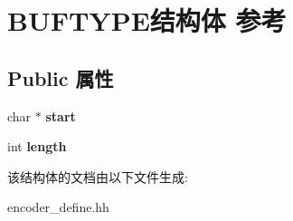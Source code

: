 \hypertarget{struct_b_u_f_t_y_p_e}{}\section{B\+U\+F\+T\+Y\+P\+E结构体 参考}
\label{struct_b_u_f_t_y_p_e}
\subsection*{Public 属性}
\begin{DoxyCompactItemize}
\item 
\mbox{\label{struct_b_u_f_t_y_p_e_a1ee3a3ea7c63917b6266757049f0e78d}} 
char $\ast$ {\bfseries start}
\item 
\mbox{\label{struct_b_u_f_t_y_p_e_ac71d7979baae81ee2205e040cddb9675}} 
int {\bfseries length}
\end{DoxyCompactItemize}


该结构体的文档由以下文件生成\+:\begin{DoxyCompactItemize}
\item 
encoder\+\_\+define.\+hh\end{DoxyCompactItemize}
